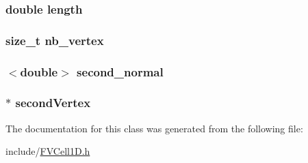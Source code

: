 \hypertarget{classFVCell1D_a928b11f5716331f0b89abe7d8d4124b4}{
\subsubsection[{length}]{\setlength{\rightskip}{0pt plus 5cm}double {\bf length}}}
\label{dc/df2/classFVCell1D_a928b11f5716331f0b89abe7d8d4124b4}
\hypertarget{classFVCell1D_a0a063e99fbc85e837d93dfbcda6f5252}{
\subsubsection[{nb\_\-vertex}]{\setlength{\rightskip}{0pt plus 5cm}size\_\-t {\bf nb\_\-vertex}}}
\label{dc/df2/classFVCell1D_a0a063e99fbc85e837d93dfbcda6f5252}
\hypertarget{classFVCell1D_afcc978d58cef2439dc0587b60e3fb727}{
\subsubsection[{second\_\-normal}]{$<$double$>$ {\bf second\_\-normal}}}
\label{dc/df2/classFVCell1D_afcc978d58cef2439dc0587b60e3fb727}
\hypertarget{classFVCell1D_afae31f3f40827a0997d66b07c4a040c2}{
\subsubsection[{secondVertex}]{ $\ast$ {\bf secondVertex}}}
\label{dc/df2/classFVCell1D_afae31f3f40827a0997d66b07c4a040c2}


The documentation for this class was generated from the following file:\begin{DoxyCompactItemize}
\item 
include/\hyperlink{FVCell1D_8h}{FVCell1D.h}\end{DoxyCompactItemize}
